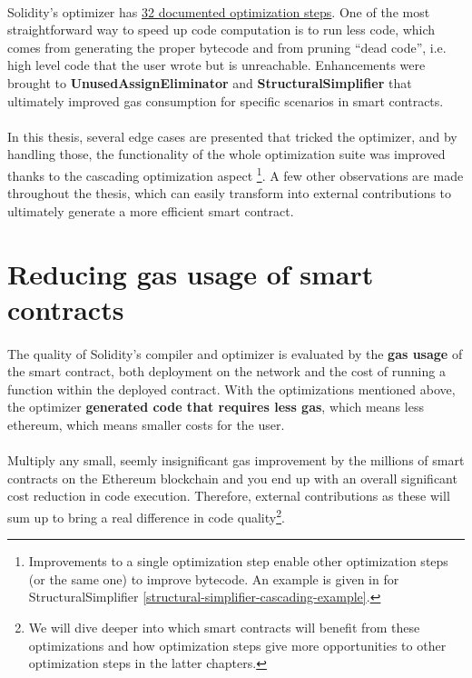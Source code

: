 \paragraph*{}
Solidity's optimizer has \href{https://docs.soliditylang.org/en/v0.8.14/internals/optimizer.html#optimizer-steps}{32 documented optimization steps}. One of the most straightforward way to speed up code computation is to run less code, which comes from generating the proper bytecode and from pruning ``dead code'', i.e. high level code that the user wrote but is unreachable. Enhancements were brought to \textbf{UnusedAssignEliminator} and \textbf{StructuralSimplifier} that ultimately improved gas consumption for specific scenarios in smart contracts.

\paragraph*{}
In this thesis, several edge cases are presented that tricked the optimizer, and by handling those, the functionality of the whole optimization suite was improved thanks to the cascading optimization aspect \footnote{Improvements to a single optimization step enable other optimization steps (or the same one) to improve bytecode. An example is given in for StructuralSimplifier \ref{structural-simplifier-cascading-example}.}. A few other observations are made throughout the thesis, which can easily transform into external contributions to ultimately generate a more efficient smart contract.

\section{Reducing gas usage of smart contracts}
\paragraph*{}
The quality of Solidity's compiler and optimizer is evaluated by the \textbf{gas usage} of the smart contract, both deployment on the network and the cost of running a function within the deployed contract. With the optimizations mentioned above, the optimizer \textbf{generated code that requires less gas}, which means less ethereum, which means smaller costs for the user.

\paragraph*{}
Multiply any small, seemly insignificant gas improvement by the millions of smart contracts on the Ethereum blockchain and you end up with an overall significant cost reduction in code execution. Therefore, external contributions as these will sum up to bring a real difference in code quality\footnote{We will dive deeper into which smart contracts will benefit from these optimizations and how optimization steps give more opportunities to other optimization steps in the latter chapters.}.
